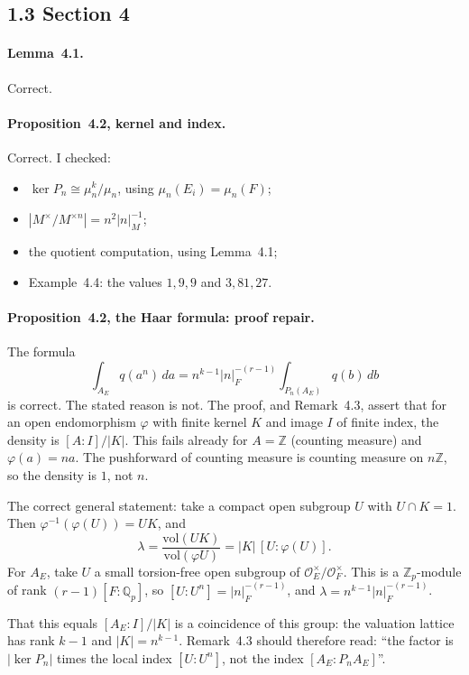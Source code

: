 \documentclass[11pt]{article}
\begin{document}
\subsection*{1.3 Section 4}
\paragraph{Lemma~4.1.} Correct.

\paragraph{Proposition~4.2, kernel and index.} Correct. I checked:
\begin{itemize}
\item $\ker P_n\cong\mu_n^k/\mu_n$, using $\mu_n(E_i)=\mu_n(F)$;
\item $|M^\times/M^{\times n}|=n^2|n|_M^{-1}$;
\item the quotient computation, using Lemma~4.1;
\item Example~4.4: the values $1,9,9$ and $3,81,27$.
\end{itemize}

\paragraph{Proposition~4.2, the Haar formula: proof repair.} The formula
\[
\int_{A_E}q(a^n)\,da=n^{k-1}|n|_F^{-(r-1)}\int_{P_n(A_E)}q(b)\,db
\]
is correct. The stated reason is not. The proof, and Remark~4.3, assert
that for an open endomorphism $\varphi$ with finite kernel $K$ and image
$I$ of finite index, the density is $[A:I]/|K|$. This fails already for
$A=\mathbb Z$ (counting measure) and $\varphi(a)=na$. The pushforward of
counting measure is counting measure on $n\mathbb Z$, so the density is
$1$, not $n$.

The correct general statement: take a compact open subgroup $U$ with
$U\cap K=1$. Then $\varphi^{-1}(\varphi(U))=UK$, and
\[
\lambda=\frac{\mathrm{vol}(UK)}{\mathrm{vol}(\varphi U)}
=|K|\,[U:\varphi(U)].
\]
For $A_E$, take $U$ a small torsion-free open subgroup of
$\mathcal O_E^\times/\mathcal O_F^\times$. This is a $\mathbb Z_p$-module
of rank $(r-1)[F:\mathbb Q_p]$, so $[U:U^n]=|n|_F^{-(r-1)}$, and
$\lambda=n^{k-1}|n|_F^{-(r-1)}$.

That this equals $[A_E:I]/|K|$ is a coincidence of this group: the
valuation lattice has rank $k-1$ and $|K|=n^{k-1}$. Remark~4.3 should
therefore read: ``the factor is $|\ker P_n|$ times the local index
$[U:U^n]$, not the index $[A_E:P_nA_E]$''.
\end{document}
